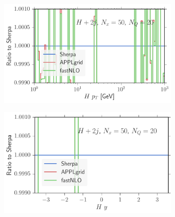 \begin{figure}
\centering
\begin{subfigure}[]{0.49\textwidth}
	\includegraphics[width=\textwidth]{images/hjjrs_hpt.pdf}
\end{subfigure}
\hfill
\begin{subfigure}[]{0.49\textwidth}
	\includegraphics[width=\textwidth]{images/hjjrs_hy.pdf}
\end{subfigure}


\end{figure}
